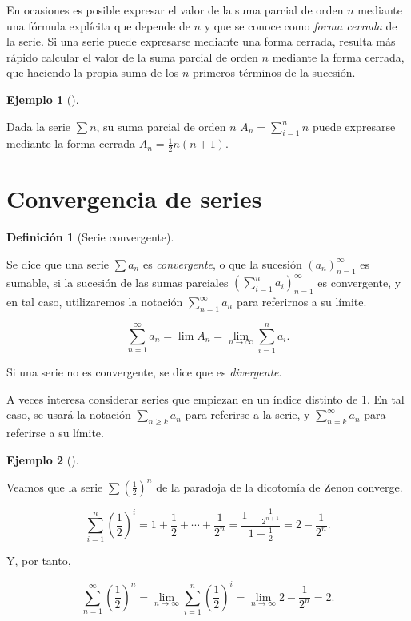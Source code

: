\documentclass[
  a4paper,
]{scrreport}
\theoremstyle{plain}
\theoremstyle{plain}
\theoremstyle{definition}
\newtheorem{definition}{Definición}[chapter]
\theoremstyle{definition}
\newtheorem{example}{Ejemplo}[chapter]
\theoremstyle{plain}
\theoremstyle{remark}
\begin{document}
En ocasiones es posible expresar el valor de la suma parcial de orden
\(n\) mediante una fórmula explícita que depende de \(n\) y que se
conoce como \emph{forma cerrada} de la serie. Si una serie puede
expresarse mediante una forma cerrada, resulta más rápido calcular el
valor de la suma parcial de orden \(n\) mediante la forma cerrada, que
haciendo la propia suma de los \(n\) primeros términos de la sucesión.

\leavevmode{}%
\begin{example}[]\label{exm-serie-forma-cerrada}

Dada la serie \(\sum n\), su suma parcial de orden \(n\)
\(A_n=\sum_{i=1}^n n\) puede expresarse mediante la forma cerrada
\(A_n = \frac{1}{2}n(n+1)\).

\end{example}

\hypertarget{convergencia-de-series}{%
\section{Convergencia de series}\label{convergencia-de-series}}

\leavevmode{}%
\begin{definition}[Serie convergente]\label{def-serie-convergente}

Se dice que una serie \(\sum a_n\) es \emph{convergente}, o que la
sucesión \((a_n)_{n=1}^\infty\) es sumable, si la sucesión de las sumas
parciales \(\left(\sum_{i=1}^n a_i\right)_{n=1}^\infty\) es convergente,
y en tal caso, utilizaremos la notación \(\sum_{n=1}^\infty a_n\) para
referirnos a su límite.

\[
\sum_{n=1}^{\infty} a_n=\lim A_n = \lim_{n\to\infty} \sum_{i=1}^n a_i.
\]

\end{definition}

Si una serie no es convergente, se dice que es \emph{divergente}.

A veces interesa considerar series que empiezan en un índice distinto de
1. En tal caso, se usará la notación \(\sum_{n\geq k}a_n\) para
referirse a la serie, y \(\sum_{n=k}^\infty a_n\) para referirse a su
límite.

\leavevmode{}%
\begin{example}[]\label{exm-serie-paradoja-zenon}

Veamos que la serie \(\sum \left(\frac{1}{2}\right)^n\) de la paradoja
de la dicotomía de Zenon converge.

\[
\sum_{i=1}^n \left(\frac{1}{2}\right)^i = 1 + \frac{1}{2} + \cdots +\frac{1}{2^n} = \frac{1-\frac{1}{2^{n+1}}}{1-\frac{1}{2}} = 2-\frac{1}{2^n}.
\]

Y, por tanto,

\[
\sum_{n=1}^\infty \left(\frac{1}{2}\right)^n = \lim_{n\to\infty} \sum_{i=1}^n \left(\frac{1}{2}\right)^i = \lim_{n\to\infty} 2-\frac{1}{2^n} = 2.
\]

\end{example}
\end{document}
